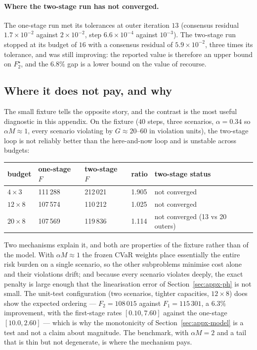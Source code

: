 \documentclass[11pt]{article}
\begin{document}
\paragraph{Where the two-stage run has not converged.} The one-stage run met its
tolerances at outer iteration $13$ (consensus residual $1.7\times10^{-2}$ against
$2\times10^{-2}$, step $6.6\times10^{-4}$ against $10^{-3}$). The two-stage run
stopped at its budget of $16$ with a consensus residual of
$5.9\times10^{-2}$, three times its tolerance, and was still improving: the
reported value is therefore an upper bound on $F_2^\star$, and the $6.8\%$ gap is
a lower bound on the value of recourse.

\subsection{Where it does not pay, and why}

The small fixture tells the opposite story, and the contrast is the most useful
diagnostic in this appendix. On the fixture ($40$ steps, three scenarios,
$\alpha=0.34$ so $\alpha M\approx1$, every scenario violating by
$G\approx20$--$60$ in violation units), the two-stage loop is not reliably
better than the here-and-now loop and is unstable across budgets:

\begin{center}
\small
\begin{tabularx}{\textwidth}{@{}l l l l X@{}}
\toprule
budget & one-stage $F$ & two-stage $F$ & ratio & two-stage status \\
\midrule
$4\times3$ & 111\,288 & 212\,021 & 1.905 & not converged \\
$12\times8$ & 107\,574 & 110\,212 & 1.025 & not converged \\
$20\times8$ & 107\,569 & 119\,836 & 1.114 & not converged (13 vs 20 outers) \\
\bottomrule
\end{tabularx}
\end{center}

Two mechanisms explain it, and both are properties of the fixture rather than of
the model. With $\alpha M\approx1$ the frozen CVaR weights place essentially the
entire risk burden on a single scenario, so the other subproblems minimise cost
alone and their violations drift; and because every scenario violates deeply,
the exact penalty is large enough that the linearisation error of
Section~\ref{sec:appx-ph} is not small. The unit-test configuration (two
scenarios, tighter capacities, $12\times8$) does show the expected ordering ---
$F_2=108\,015$ against $F_1=115\,301$, a $6.3\%$ improvement, with the
first-stage rates $[0.10,7.60]$ against the one-stage $[10.0,2.60]$ --- which is
why the monotonicity of Section~\ref{sec:appx-model} is a test and not a claim
about magnitude. The benchmark, with $\alpha M=2$ and a tail that is thin but not
degenerate, is where the mechanism pays.
\end{document}
